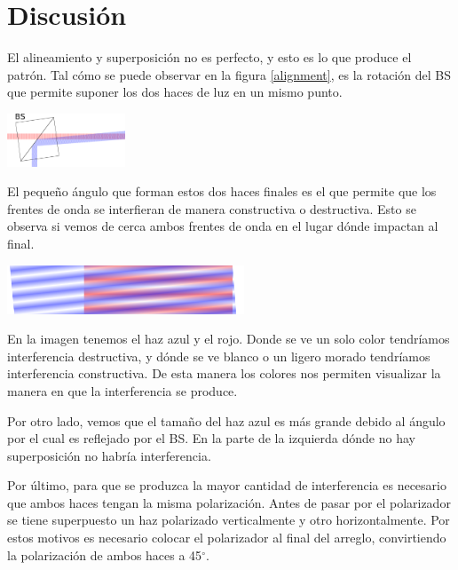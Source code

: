 \documentclass[twocolumn]{article}
\begin{document}
	\section{Discusión}
		El alineamiento y superposición no es perfecto, y esto es lo que produce el patrón. Tal cómo se puede observar en la figura \ref{alignment}, es la rotación del BS que permite suponer los dos haces de luz en un mismo punto.

		\begin{center}
			\includegraphics[width=100pt]{img/alignment.pdf}
			\label{alignment}
		\end{center}

		El pequeño ángulo que forman estos dos haces finales es el que permite que los frentes de onda se interfieran de manera constructiva o destructiva. Esto se observa si vemos de cerca ambos frentes de onda en el lugar dónde impactan al final.

		\begin{center}
			\includegraphics[width=200pt]{img/zoom_in.png}
			\label{zoom_in}
		\end{center}

		En la imagen tenemos el haz azul y el rojo. Donde se ve un solo color tendríamos interferencia destructiva, y dónde se ve blanco o un ligero morado tendríamos interferencia constructiva. De esta manera los colores nos permiten visualizar la manera en que la interferencia se produce.

		Por otro lado, vemos que el tamaño del haz azul es más grande debido al ángulo por el cual es reflejado por el BS. En la parte de la izquierda dónde no hay superposición no habría interferencia.

		Por último, para que se produzca la mayor cantidad de interferencia es necesario que ambos haces tengan la misma polarización. Antes de pasar por el polarizador se tiene superpuesto un haz polarizado verticalmente y otro horizontalmente. Por estos motivos es necesario colocar el polarizador al final del arreglo, convirtiendo la polarización de ambos haces a 45$^{\circ}$.
\end{document}
